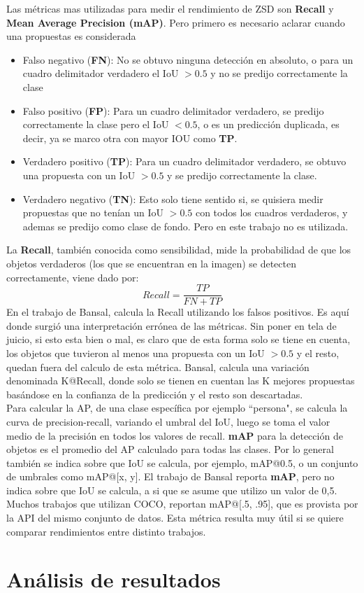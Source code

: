 Las métricas mas utilizadas para medir el rendimiento de ZSD son \textbf{Recall} y \textbf{Mean Average Precision (mAP)}. Pero primero es necesario aclarar cuando una propuestas es considerada
\begin{itemize}
	\item Falso negativo (\textbf{FN}): No se obtuvo ninguna detección en absoluto, o para un cuadro delimitador verdadero el IoU $> 0.5$ y no se predijo correctamente la clase
	\item Falso positivo (\textbf{FP}): Para un cuadro delimitador verdadero, se predijo correctamente la clase pero el IoU $< 0.5$, o es un predicción duplicada, es decir, ya se marco otra con mayor IOU como \textbf{TP}.
	\item Verdadero positivo (\textbf{TP}): Para un cuadro delimitador verdadero, se obtuvo  una propuesta con un IoU $> 0.5$ y se predijo correctamente la clase.
	\item Verdadero negativo (\textbf{TN}): Esto solo tiene sentido si, se quisiera medir propuestas que no tenían un IoU $> 0.5$ con todos los cuadros verdaderos, y ademas se predijo como clase de fondo. Pero en este trabajo no es utilizada.
\end{itemize}

La \textbf{Recall}, también conocida como sensibilidad, mide la probabilidad de que los objetos verdaderos (los que se encuentran en la imagen) se detecten correctamente, viene dado por: \[Recall =\frac{TP}{FN+TP}\] En el trabajo de Bansal, calcula la Recall utilizando los falsos positivos. Es aquí donde surgió una interpretación errónea de las métricas. Sin poner en tela de juicio, si esto esta bien o mal, es claro que de esta forma solo se tiene en cuenta, los objetos que tuvieron al menos una propuesta con un IoU $> 0.5$ y el resto, quedan fuera del calculo de esta métrica. Bansal, calcula una variación denominada K@Recall, donde solo se tienen en cuentan las K mejores propuestas basándose en la confianza de la predicción y el resto son descartadas.\\

Para calcular la AP, de una clase específica por ejemplo ``persona", se calcula la curva de precision-recall, variando el umbral del IoU, luego se toma el valor medio de la precisión en todos los valores de recall. \textbf{mAP} para la detección de objetos es el promedio del AP calculado para todas las clases. Por lo general también se indica sobre que IoU se calcula, por ejemplo, mAP@0.5, o un conjunto de umbrales como mAP@[x, y]. El trabajo de Bansal reporta \textbf{mAP}, pero no indica sobre que IoU se calcula, a si que se asume que utilizo un valor de 0,5. Muchos trabajos que utilizan COCO, reportan mAP@[.5, .95], que es provista por la API del mismo conjunto de datos. Esta métrica resulta muy útil si se quiere comparar rendimientos entre distinto trabajos.

\section{Análisis de resultados}

